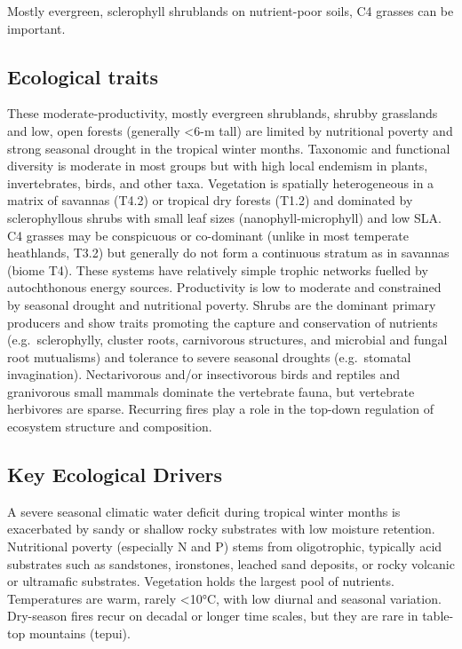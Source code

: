 \documentclass[
  letterpaper,
  DIV=11,
  numbers=noendperiod]{scrartcl}
\begin{document}
Mostly evergreen, sclerophyll shrublands on nutrient-poor soils, C4
grasses can be important.

\subsection{Ecological traits}\label{ecological-traits-79}

These moderate-productivity, mostly evergreen shrublands, shrubby
grasslands and low, open forests (generally \textless6-m tall) are
limited by nutritional poverty and strong seasonal drought in the
tropical winter months. Taxonomic and functional diversity is moderate
in most groups but with high local endemism in plants, invertebrates,
birds, and other taxa. Vegetation is spatially heterogeneous in a matrix
of savannas (T4.2) or tropical dry forests (T1.2) and dominated by
sclerophyllous shrubs with small leaf sizes (nanophyll-microphyll) and
low SLA. C4 grasses may be conspicuous or co-dominant (unlike in most
temperate heathlands, T3.2) but generally do not form a continuous
stratum as in savannas (biome T4). These systems have relatively simple
trophic networks fuelled by autochthonous energy sources. Productivity
is low to moderate and constrained by seasonal drought and nutritional
poverty. Shrubs are the dominant primary producers and show traits
promoting the capture and conservation of nutrients (e.g.~sclerophylly,
cluster roots, carnivorous structures, and microbial and fungal root
mutualisms) and tolerance to severe seasonal droughts (e.g.~stomatal
invagination). Nectarivorous and/or insectivorous birds and reptiles and
granivorous small mammals dominate the vertebrate fauna, but vertebrate
herbivores are sparse. Recurring fires play a role in the top-down
regulation of ecosystem structure and composition.

\subsection{Key Ecological Drivers}\label{key-ecological-drivers-79}

A severe seasonal climatic water deficit during tropical winter months
is exacerbated by sandy or shallow rocky substrates with low moisture
retention. Nutritional poverty (especially N and P) stems from
oligotrophic, typically acid substrates such as sandstones, ironstones,
leached sand deposits, or rocky volcanic or ultramafic substrates.
Vegetation holds the largest pool of nutrients. Temperatures are warm,
rarely \textless10°C, with low diurnal and seasonal variation.
Dry-season fires recur on decadal or longer time scales, but they are
rare in table-top mountains (tepui).
\end{document}

